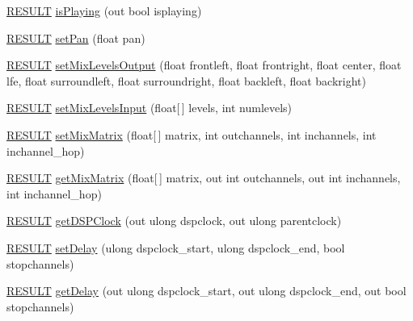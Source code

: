 \begin{DoxyCompactItemize}
\item 
\hyperlink{namespace_f_m_o_d_a305d1176ef3f8c8815861a60407ac33d}{R\+E\+S\+U\+LT} \hyperlink{class_f_m_o_d_1_1_channel_control_a3f44d3f1fffe56b475f6e6b98297a330}{is\+Playing} (out bool isplaying)
\item 
\hyperlink{namespace_f_m_o_d_a305d1176ef3f8c8815861a60407ac33d}{R\+E\+S\+U\+LT} \hyperlink{class_f_m_o_d_1_1_channel_control_a24f9a0e87f7ba9f80121f060f0cfed42}{set\+Pan} (float pan)
\item 
\hyperlink{namespace_f_m_o_d_a305d1176ef3f8c8815861a60407ac33d}{R\+E\+S\+U\+LT} \hyperlink{class_f_m_o_d_1_1_channel_control_a384d9495da672ce2cb78f1026dc7d980}{set\+Mix\+Levels\+Output} (float frontleft, float frontright, float center, float lfe, float surroundleft, float surroundright, float backleft, float backright)
\item 
\hyperlink{namespace_f_m_o_d_a305d1176ef3f8c8815861a60407ac33d}{R\+E\+S\+U\+LT} \hyperlink{class_f_m_o_d_1_1_channel_control_a88d1b4192bec02ddd3ba1029f7d31efa}{set\+Mix\+Levels\+Input} (float\mbox{[}$\,$\mbox{]} levels, int numlevels)
\item 
\hyperlink{namespace_f_m_o_d_a305d1176ef3f8c8815861a60407ac33d}{R\+E\+S\+U\+LT} \hyperlink{class_f_m_o_d_1_1_channel_control_af65b7226fdce56ef5cba5ca3aa3f0231}{set\+Mix\+Matrix} (float\mbox{[}$\,$\mbox{]} matrix, int outchannels, int inchannels, int inchannel\+\_\+hop)
\item 
\hyperlink{namespace_f_m_o_d_a305d1176ef3f8c8815861a60407ac33d}{R\+E\+S\+U\+LT} \hyperlink{class_f_m_o_d_1_1_channel_control_aedc914ffd91040a2e7044eeacef0bda0}{get\+Mix\+Matrix} (float\mbox{[}$\,$\mbox{]} matrix, out int outchannels, out int inchannels, int inchannel\+\_\+hop)
\item 
\hyperlink{namespace_f_m_o_d_a305d1176ef3f8c8815861a60407ac33d}{R\+E\+S\+U\+LT} \hyperlink{class_f_m_o_d_1_1_channel_control_a8153e1f26fce11415d3f56bb6d20091b}{get\+D\+S\+P\+Clock} (out ulong dspclock, out ulong parentclock)
\item 
\hyperlink{namespace_f_m_o_d_a305d1176ef3f8c8815861a60407ac33d}{R\+E\+S\+U\+LT} \hyperlink{class_f_m_o_d_1_1_channel_control_a054876159fc34717895c242e70232faf}{set\+Delay} (ulong dspclock\+\_\+start, ulong dspclock\+\_\+end, bool stopchannels)
\item 
\hyperlink{namespace_f_m_o_d_a305d1176ef3f8c8815861a60407ac33d}{R\+E\+S\+U\+LT} \hyperlink{class_f_m_o_d_1_1_channel_control_a5749aed9842abbb5eacc05d8a5df4844}{get\+Delay} (out ulong dspclock\+\_\+start, out ulong dspclock\+\_\+end, out bool stopchannels)

\end{DoxyCompactItemize}
